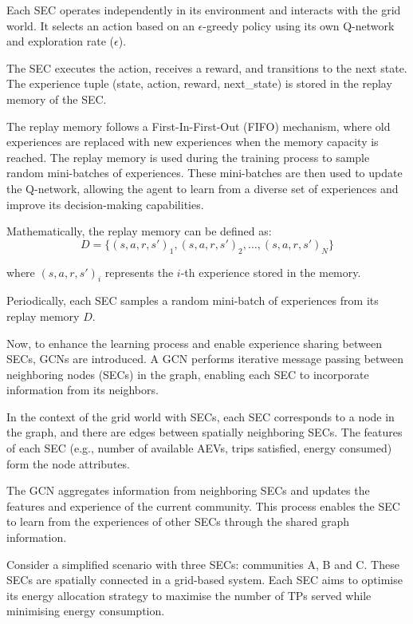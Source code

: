 Each SEC operates independently in its environment and interacts with the grid world. It selects an action based on an $\epsilon$-greedy policy using its own Q-network and exploration rate ($\epsilon$).

The SEC executes the action, receives a reward, and transitions to the next state. The experience tuple (state, action, reward, next\_state) is stored in the replay memory of the SEC.

The replay memory follows a First-In-First-Out (FIFO) mechanism, where old experiences are replaced with new experiences when the memory capacity is reached. The replay memory is used during the training process to sample random mini-batches of experiences. These mini-batches are then used to update the Q-network, allowing the agent to learn from a diverse set of experiences and improve its decision-making capabilities.

Mathematically, the replay memory can be defined as:
\[ D = \{(s, a, r, s')_1, (s, a, r, s')_2, \ldots, (s, a, r, s')_N\} \]

where $(s, a, r, s')_i$ represents the $i$-th experience stored in the memory. 

Periodically, each SEC samples a random mini-batch of experiences from its replay memory $D$.

Now, to enhance the learning process and enable experience sharing between SECs, GCNs are introduced. A GCN performs iterative message passing between neighboring nodes (SECs) in the graph, enabling each SEC to incorporate information from its neighbors.

In the context of the grid world with SECs, each SEC corresponds to a node in the graph, and there are edges between spatially neighboring SECs. The features of each SEC (e.g., number of available AEVs, trips satisfied, energy consumed) form the node attributes.

The GCN aggregates information from neighboring SECs and updates the features and experience of the current community. This process enables the SEC to learn from the experiences of other SECs through the shared graph information.

Consider a simplified scenario with three SECs: communities A, B and C. These SECs are spatially connected in a grid-based system. Each SEC aims to optimise its energy allocation strategy to maximise the number of TPs served while minimising energy consumption.

